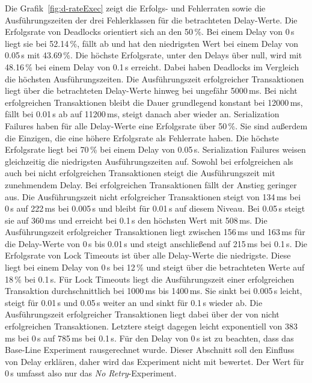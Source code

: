 
Die Grafik~\ref{fig:d-rateExec} zeigt die Erfolgs- und Fehlerraten sowie die Ausführungszeiten der drei Fehlerklassen
für die betrachteten Delay-Werte.
Die Erfolgsrate von Deadlocks orientiert sich an den 50\,\%.
Bei einem Delay von 0\,s liegt sie bei 52.14\,\%, fällt ab und hat den niedrigsten Wert bei einem Delay von 0.05\,s mit 43.69\,\%.
Die höchste Erfolgsrate, unter den Delays über null, wird mit 48.16\,\% bei einem Delay von 0.1\,s erreicht.
Dabei haben Deadlocks im Vergleich die höchsten Ausführungszeiten.
Die Ausführungszeit erfolgreicher Transaktionen liegt über die betrachteten Delay-Werte hinweg bei ungefähr 5000\,ms.
Bei nicht erfolgreichen Transaktionen bleibt die Dauer grundlegend konstant bei 12000\,ms, fällt bei 0.01\,s ab auf
11200\,ms, steigt danach aber wieder an.
Serialization Failures haben für alle Delay-Werte eine Erfolgsrate über 50\,\%.
Sie sind außerdem die Einzigen, die eine höhere Erfolgsrate als Fehlerrate haben.
Die höchste Erfolgsrate liegt bei 70\,\% bei einem Delay von 0.05\,s.
Serialization Failures weisen gleichzeitig die niedrigsten Ausführungszeiten auf.
Sowohl bei erfolgreichen als auch bei nicht erfolgreichen Transaktionen steigt die Ausführungszeit mit zunehmendem
Delay.
Bei erfolgreichen Transaktionen fällt der Anstieg geringer aus.
Die Ausführungszeit nicht erfolgreicher Transaktionen steigt von 134\,ms bei 0\,s auf 222\,ms bei 0.005\,s und bleibt für 0.01\,s
auf diesem Niveau.
Bei 0.05\,s steigt sie auf 360\,ms und erreicht bei 0.1\,s den höchsten Wert mit 508\,ms.
Die Ausführungszeit erfolgreicher Transaktionen liegt zwischen 156\,ms und 163\,ms für die Delay-Werte von 0\,s bis 0.01\,s
und steigt anschließend auf 215\,ms bei 0.1\,s.
Die Erfolgsrate von Lock Timeouts ist über alle Delay-Werte die niedrigste.
Diese liegt bei einem Delay von 0\,s bei 12\,\% und steigt über die betrachteten Werte auf 18\,\% bei 0.1\,s.
Für Lock Timeouts liegt die Ausführungszeit einer erfolgreichen Transaktion durchschnittlich bei 1000\,ms bis 1400\,ms.
Sie sinkt bei 0.005\,s leicht, steigt für 0.01\,s und 0.05\,s weiter an und sinkt für 0.1\,s wieder ab.
Die Ausführungszeit erfolgreicher Transaktionen liegt dabei über der von nicht erfolgreichen Transaktionen.
Letztere steigt dagegen leicht exponentiell von 383\,ms bei 0\,s auf 785\,ms bei 0.1\,s.
Für den Delay von 0\,s ist zu beachten, dass das Base-Line Experiment rausgerechnet wurde.
Dieser Abschnitt soll den Einfluss von Delay erklären, daher wird das Experiment nicht mit bewertet.
Der Wert für 0\,s umfasst also nur das \emph{No Retry}-Experiment.

